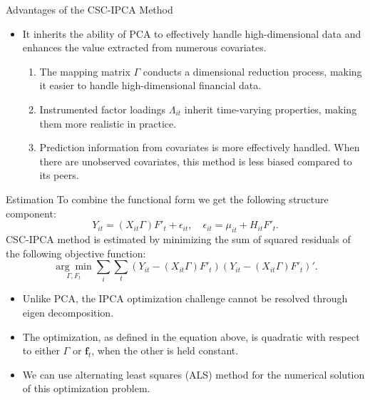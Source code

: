 \documentclass{beamer}
\begin{document}
\begin{frame}{Advantages of the CSC-IPCA Method}
    \begin{itemize}
        \item It inherits the ability of PCA to effectively handle high-dimensional data and enhances the value extracted from numerous covariates.
        \begin{enumerate}
            \item The mapping matrix $\Gamma$ conducts a dimensional reduction process, making it easier to handle high-dimensional financial data.
            \item Instrumented factor loadings $\Lambda_{it}$ inherit time-varying properties, making them more realistic in practice.
            \item Prediction information from covariates is more effectively handled. When there are unobserved covariates, this method is less biased compared to its peers.
        \end{enumerate}
    \end{itemize}
\end{frame}

\begin{frame}{Estimation}
To combine the functional form we get the following structure component:
$$
Y_{it} = (X_{it}\Gamma) F'_{t} + \epsilon_{it}, \quad \epsilon_{it} = \mu_{it} + H_{it} F'_t.
$$
CSC-IPCA method is estimated by minimizing the sum of squared residuals of the following objective function:
$$
\underset{\Gamma, F_t}{\arg\min} \sum_{i} \sum_{t}\left( Y_{it} -(X_{it}\Gamma) F'_{t} \right)\left( Y_{it} - (X_{it}\Gamma) F'_{t}\right)'.
$$
\begin{itemize}
    \item Unlike PCA, the IPCA optimization challenge cannot be resolved through eigen decomposition.
    \item The optimization, as defined in the equation above, is quadratic with respect to either $\Gamma$ or $\boldsymbol{f}_t$, when the other is held constant.
    \item We can use alternating least squares (ALS) method for the numerical solution of this optimization problem.
\end{itemize}
\end{frame}
\end{document}

